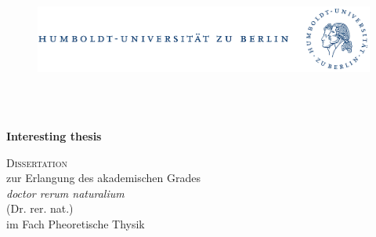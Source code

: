 \begin{titlepage}
  \begin{center}
    
    \vspace{-2cm}
    \begin{figure}[ht]
      \begin{center}
        \includegraphics[width=\textwidth]{bilder/HUB-Emblem}
      \end{center}
    \end{figure}

    \begin{Large}
      \begin{center}
		\noindent\hrulefill \\
		\Large{}
		\vspace{-3mm}
		\noindent\hrulefill \\
      \end{center}
      \vspace{0.2cm}

      \begin{center}
        \Large{\textbf{
                Interesting thesis
        }}\\
      \end{center}
     \end{Large}
    
    \begin{large}
      \begin{center}
	\vspace{0.5cm} \textsc{Dissertation}\\ 
	\vspace{0.5cm} zur Erlangung des akademischen Grades \\ 
    \vspace{0.2cm}
    \textit{doctor rerum naturalium}\\
    (Dr. rer. nat.)\\
    \vspace{0.2cm}
    im Fach Pheoretische Thysik
      \end{center}
    \end{large}


\end{center}
\end{titlepage}

